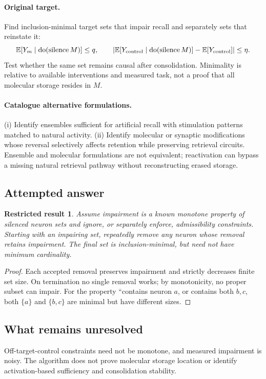 \documentclass[11pt]{article}
\newcommand{\E}{\mathbb E}
\providecommand{\E}{\mathbb E}
\newtheorem{attemptresult}{Restricted result}[section]
\begin{document}
\paragraph{Original target.}
Find inclusion-minimal target sets that impair recall and separately sets that reinstate it:
\[
\E[Y_m\mid\operatorname{do}(\operatorname{silence}M)]\leq q,
\qquad
|\E[Y_{\rm control}\mid\operatorname{do}(\operatorname{silence}M)]-\E[Y_{\rm control}]|\leq\eta.
\]
Test whether the same set remains causal after consolidation. Minimality is relative to available interventions and measured task, not a proof that all molecular storage resides in $M$.
\paragraph{Catalogue alternative formulations.}
(i) Identify ensembles sufficient for artificial recall with stimulation patterns matched to natural activity. (ii) Identify molecular or synaptic modifications whose reversal selectively affects retention while preserving retrieval circuits. Ensemble and molecular formulations are not equivalent; reactivation can bypass a missing natural retrieval pathway without reconstructing erased storage.
\subsection{Attempted answer}
\begin{attemptresult}
Assume impairment is a known monotone property of silenced neuron sets and ignore, or separately enforce, admissibility constraints. Starting with an impairing set, repeatedly remove any neuron whose removal retains impairment. The final set is inclusion-minimal, but need not have minimum cardinality.
\end{attemptresult}
\begin{proof}
Each accepted removal preserves impairment and strictly decreases finite set size. On termination no single removal works; by monotonicity, no proper subset can impair. For the property ``contains neuron $a$, or contains both $b,c$, both $\{a\}$ and $\{b,c\}$ are minimal but have different sizes.
\end{proof}
\subsection{What remains unresolved}
Off-target-control constraints need not be monotone, and measured impairment is noisy. The algorithm does not prove molecular storage location or identify activation-based sufficiency and consolidation stability.
\end{document}

